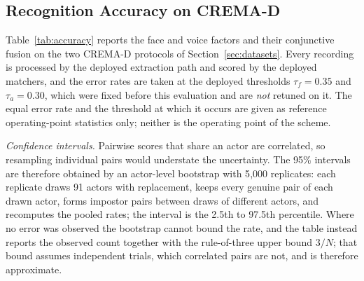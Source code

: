 \documentclass[10pt,journal,compsoc]{IEEEtran}
\begin{document}
{\color{revpink}
\subsection{Recognition Accuracy on CREMA-D}\label{sec:accuracy}
Table~\ref{tab:accuracy} reports the face and voice factors and their conjunctive fusion on the two CREMA-D protocols of Section~\ref{sec:datasets}. Every recording is processed by the deployed extraction path and scored by the deployed matchers, and the error rates are taken at the deployed thresholds $\tau_f=0.35$ and $\tau_a=0.30$, which were fixed before this evaluation and are \emph{not} retuned on it. The equal error rate and the threshold at which it occurs are given as reference operating-point statistics only; neither is the operating point of the scheme.

\emph{Confidence intervals.} Pairwise scores that share an actor are correlated, so resampling individual pairs would understate the uncertainty. The 95\% intervals are therefore obtained by an actor-level bootstrap with 5{,}000 replicates: each replicate draws 91 actors with replacement, keeps every genuine pair of each drawn actor, forms impostor pairs between draws of different actors, and recomputes the pooled rates; the interval is the 2.5th to 97.5th percentile. Where no error was observed the bootstrap cannot bound the rate, and the table instead reports the observed count together with the rule-of-three upper bound $3/N$; that bound assumes independent trials, which correlated pairs are not, and is therefore approximate.

}
\end{document}
